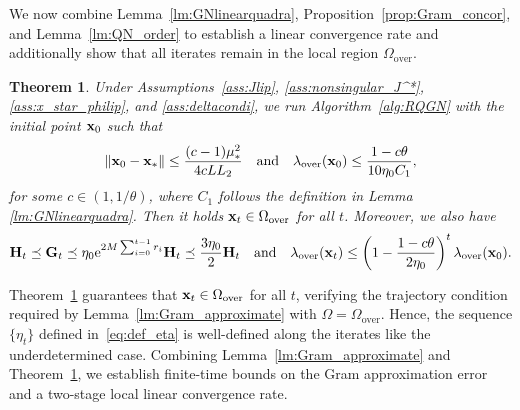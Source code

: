\documentclass[11pt]{article}
\theoremstyle{plain}
\newtheorem{theorem}{Theorem}
\theoremstyle{definition}
\theoremstyle{remark}
\theoremstyle{plain}
\def\G{{\bf G}}
\def\H{{\bf H}}
\def\x{{\bf x}}
\begin{document}
We now combine Lemma~\ref{lm:GNlinearquadra}, Proposition~\ref{prop:Gram_concor}, and Lemma~\ref{lm:QN_order} to establish a linear convergence rate and additionally show that all iterates remain in the local region 
$\Omega_{\mathrm{over}}$.
\begin{theorem}
\label{thm:linear1n>d}
Under Assumptions~\ref{ass:Jlip}, \ref{ass:nonsingular_J^*}, \ref{ass:x_star_philip}, and \ref{ass:deltacondi}, 
we run Algorithm~\ref{alg:RQGN} with the initial point $\x_0$ such that
\begin{align}
\label{eq:linear_initial_condi}
\|\x_0-\x_*\|\leq\frac{(c-1)\mu_*^2}{4cLL_2}
\quad\text{and}\quad
\lambda_{\mathrm{over}}(\x_0)\leq \frac{1-c\theta}{10\eta_0 C_1},
\end{align}
for some $c\in(1,1/\theta)$, where $C_1$ follows the definition in Lemma \ref{lm:GNlinearquadra}.
Then it holds $\x_t\in\Omega_{\mathrm{over}}$ for all $t$. Moreover, we also have
\begin{align}
\label{eq:induc_lambda}
\H_t\preceq\G_t\preceq\eta_0{\rm e}^{2M\sum_{i=0}^{t-1}r_i}\H_t
\preceq\frac{3\eta_0}{2}\H_t
\quad\text{and}\quad
\lambda_{\mathrm{over}}(\x_t)\leq\left(1-\frac{1-c\theta}{2\eta_0}\right)^t\lambda_{\mathrm{over}}(\x_0).
\end{align}
\end{theorem}
Theorem~\ref{thm:linear1n>d} guarantees that $\x_t\in\Omega_{\mathrm{over}}$ for all $t$, verifying the trajectory condition required by Lemma~\ref{lm:Gram_approximate} with $\Omega=\Omega_{\mathrm{over}}$.
Hence, the sequence $\{\eta_t\}$ defined in~\eqref{eq:def_eta} is well-defined along the iterates like the underdetermined case.
Combining Lemma~\ref{lm:Gram_approximate} and Theorem~\ref{thm:linear1n>d}, we establish finite-time bounds on the Gram approximation error and a two-stage local linear convergence rate.
\end{document}
